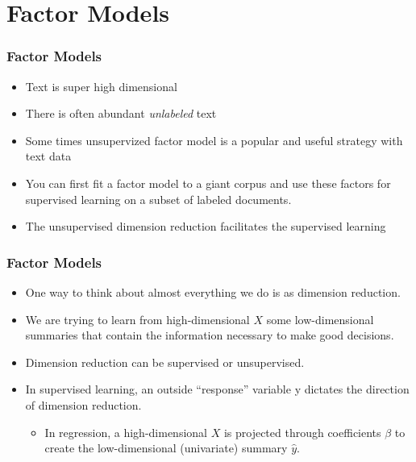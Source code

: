 \documentclass[
  shownotes,
  xcolor={svgnames},
  hyperref={colorlinks,citecolor=DarkBlue,linkcolor=DarkRed,urlcolor=DarkBlue}
  , aspectratio=169]{beamer}
\begin{document}
\section{Factor Models}
\begin{frame}
\frametitle{Factor Models}

\begin{itemize}
\item Text is super high dimensional
\medskip
\item There is often abundant {\it unlabeled} text
\medskip
\item Some times unsupervized factor model is a popular and useful strategy with text data
\medskip
\item You can first fit a factor model to a giant corpus and use these factors for supervised learning on a subset of labeled documents.
\medskip
\item The unsupervised dimension reduction facilitates the supervised learning
\end{itemize}
\end{frame}
\begin{frame}
\frametitle{Factor Models}

\begin{itemize}


\item One way to think about almost everything we do is as dimension reduction.
\medskip
 \item We are trying to learn from high-dimensional $X$ some low-dimensional summaries that contain the information necessary to make good decisions. 
 \medskip
 \item Dimension reduction can be supervised or unsupervised.
  \medskip
 \item In supervised learning, an outside  “response” variable y dictates the direction of dimension reduction.
  \medskip
  \begin{itemize}
   \item  In regression, a high-dimensional $X$ is projected through coefficients $\beta$ to create the low-dimensional (univariate) summary $\hat y$. 
  \end{itemize}


\end{itemize}
\end{frame}
\end{document}

